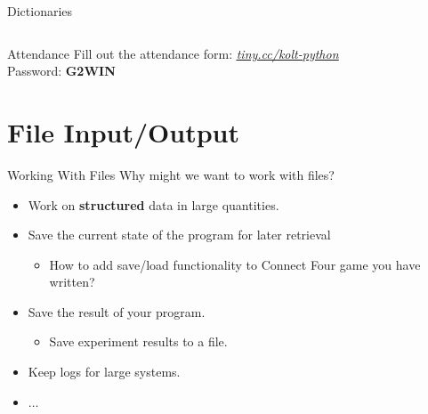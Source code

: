     \begin{frame}{Dictionaries}
        \large
        \inputminted[frame=single,framesep=2pt]{python3}{../Lecture6/code-examples/dicts.py}
    \end{frame}

    \begin{frame}{Attendance}
        \pause
        \Huge
        Fill out the attendance form: \href{https://tiny.cc/kolt-python}{\underline{\textit{tiny.cc/kolt-python}}}\\
        \pause
        Password: \textbf{G2WIN}
    \end{frame}


    \section{File Input/Output}

    \begin{frame}{Working With Files}
        \LARGE
        Why might we want to work with files?
        \begin{itemize}
            \pause
            \item Work on \textbf{structured} data in large quantities.
            \pause
            \item Save the current state of the program for later retrieval
            \begin{itemize}
                \Large
                \pause
                \item How to add save/load functionality to Connect Four game you have written?
            \end{itemize}
            \item Save the result of your program.
            \begin{itemize}
                \Large
                \pause
                \item Save experiment results to a file.
            \end{itemize} 
            \pause
            \item Keep logs for large systems.
            \pause
            \item $\dots$
        \end{itemize}
    \end{frame}

